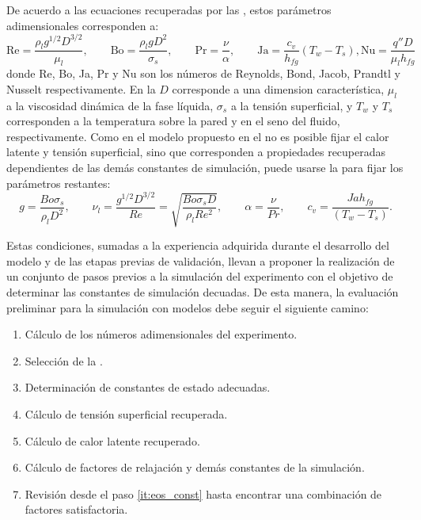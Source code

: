 De acuerdo a las ecuaciones recuperadas por las \lbe{}, estos par\'ametros adimensionales corresponden a:
\begin{equation}
	\mbox{Re} = \dfrac{\rho_l g^{1/2} D^{3/2}}{\mu_l}, \qquad
	\mbox{Bo} = \dfrac{\rho_l g D^2}{\sigma_s}, \qquad
	\mbox{Pr} = \dfrac{\nu}{\alpha}, \qquad
	\mbox{Ja} = \dfrac{c_v}{h_{fg}}(T_w-T_s),
	\mbox{Nu} = \dfrac{q'' D}{\mu_l h_{fg}}
	\label{eq:num_adim_hetb_3D}
\end{equation}
donde Re, Bo, Ja, Pr y Nu son los n\'umeros de Reynolds, Bond, Jacob, Prandtl y Nusselt respectivamente. En la  $D$ corresponde a una dimension caracter\'istica, $\mu_l$ a la viscosidad din\'amica de la fase l\'iquida, $\sigma_s$ a la tensi\'on superficial, y $T_w$ y $T_s$ corresponden a la temperatura sobre la pared y en el seno del fluido, respectivamente. Como en el modelo propuesto en el  no es posible fijar el calor latente y tensi\'on superficial, sino que corresponden a propiedades recuperadas dependientes de las dem\'as constantes de simulaci\'on, puede usarse la  para fijar los par\'ametros restantes:
\begin{equation}
	g = \dfrac{Bo \sigma_s}{\rho_l D^2}, \qquad
	\nu_l = \dfrac{g^{1/2}D^{3/2}}{Re} = \sqrt{ \dfrac{Bo \sigma_s D}{\rho_l Re^2} }, \qquad
	\alpha = \dfrac{\nu}{Pr}, \qquad
	c_v = \dfrac{Ja h_{fg}}{(T_w - T_s)}.
	\label{eq:param_adim_3D}
\end{equation}


Estas condiciones, sumadas a la experiencia adquirida durante el desarrollo del modelo y de las etapas previas de validaci\'on, llevan a proponer la realizaci\'on de un conjunto de pasos previos a la simulaci\'on del experimento con el objetivo de determinar las constantes de simulaci\'on decuadas. De esta manera, la evaluaci\'on preliminar para la simulaci\'on con modelos \pp{} debe seguir el siguiente camino:
\begin{enumerate}
	\item C\'alculo de los n\'umeros adimensionales del experimento.
	\item Selecci\'on de la \eos{}.
	\item Determinaci\'on de constantes de estado adecuadas. \label{it:eos_const}
	\item C\'alculo de tensi\'on superficial recuperada.
	\item C\'alculo de calor latente recuperado.
	\item C\'alculo de factores de relajaci\'on y dem\'as constantes de la simulaci\'on.
	\item Revisi\'on desde el paso \ref{it:eos_const} hasta encontrar una combinaci\'on de factores satisfactoria.
\end{enumerate}

